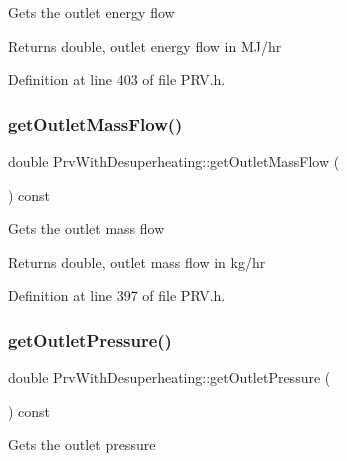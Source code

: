 Gets the outlet energy flow \begin{DoxyReturn}{Returns}
double, outlet energy flow in M\+J/hr 
\end{DoxyReturn}


Definition at line 403 of file P\+R\+V.\+h.

\mbox{\label{class_prv_with_desuperheating_a848a898a392dd7abfb030d0ca1653454}} 
\subsubsection{\texorpdfstring{get\+Outlet\+Mass\+Flow()}{getOutletMassFlow()}}
{\footnotesize\ttfamily double Prv\+With\+Desuperheating\+::get\+Outlet\+Mass\+Flow (\begin{DoxyParamCaption}{ }\end{DoxyParamCaption}) const\hspace{0.3cm}{\ttfamily [inline]}}

Gets the outlet mass flow \begin{DoxyReturn}{Returns}
double, outlet mass flow in kg/hr 
\end{DoxyReturn}


Definition at line 397 of file P\+R\+V.\+h.

\mbox{\label{class_prv_with_desuperheating_a33225afd404b54159ed700afba394c03}} 
\subsubsection{\texorpdfstring{get\+Outlet\+Pressure()}{getOutletPressure()}}
{\footnotesize\ttfamily double Prv\+With\+Desuperheating\+::get\+Outlet\+Pressure (\begin{DoxyParamCaption}{ }\end{DoxyParamCaption}) const\hspace{0.3cm}{\ttfamily [inline]}}

Gets the outlet pressure

